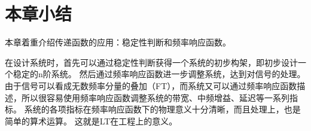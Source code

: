 \section{本章小结}

本章着重介绍传递函数的应用：稳定性判断和频率响应函数。

在设计系统时，首先可以通过稳定性判断获得一个系统的初步构架，即初步设计一个稳定的n阶系统。
然后通过频率响应函数进一步调整系统，达到对信号的处理。
由于信号可以看成无数频率分量的叠加（FT），而系统又可以通过频率响应函数描述，所以很容易使用频率响应函数调整系统的带宽、中频增益、延迟等一系列指标。
系统的各项指标在频率响应函数下的物理意义十分清晰，而且处理上，也是简单的算术运算。
这就是LT在工程上的意义。




